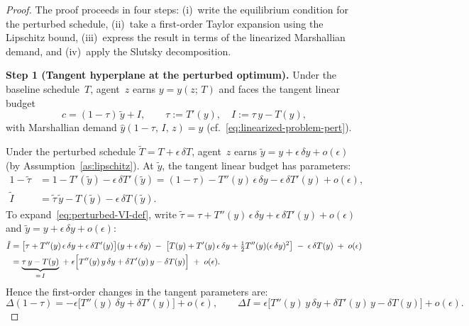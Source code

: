 \documentclass[12pt,a4paper]{article}
\theoremstyle{definition}
\theoremstyle{plain}
\theoremstyle{remark}
\begin{document}
\begin{proof}
The proof proceeds in four steps: (i)~write the equilibrium condition for the perturbed schedule, (ii)~take a first-order Taylor expansion using the Lipschitz bound, (iii)~express the result in terms of the linearized Marshallian demand, and (iv)~apply the Slutsky decomposition.

\medskip
\noindent\textbf{Step 1 (Tangent hyperplane at the perturbed optimum).}
Under the baseline schedule~$T$, agent~$z$ earns $y = y(z;\,T)$ and faces the tangent linear budget
\[
  c = (1-\tau)\,\tilde y + I,
  \qquad
  \tau := T'(y),
  \quad
  I := \tau\,y - T(y),
\]
with Marshallian demand $\hat y(1-\tau,\,I,\,z) = y$ (cf.\ \eqref{eq:linearized-problem-pert}).

Under the perturbed schedule $\tilde T = T + \epsilon\,\delta T$, agent~$z$ earns $\tilde y = y + \epsilon\,\delta y + o(\epsilon)$ (by Assumption~\ref{as:lipschitz}).  At $\tilde y$, the tangent linear budget has parameters:
\begin{align}
  1 - \tilde\tau
  &= 1 - T'(\tilde y) - \epsilon\,\delta T'(\tilde y)
  = (1-\tau) - T''(y)\,\epsilon\,\delta y - \epsilon\,\delta T'(y) + o(\epsilon),
  \label{eq:perturbed-ntr}\\[4pt]
  \tilde I
  &= \tilde\tau\,\tilde y - T(\tilde y) - \epsilon\,\delta T(\tilde y).
  \label{eq:perturbed-VI-def}
\end{align}
To expand~\eqref{eq:perturbed-VI-def}, write $\tilde\tau = \tau + T''(y)\,\epsilon\,\delta y + \epsilon\,\delta T'(y) + o(\epsilon)$ and $\tilde y = y + \epsilon\,\delta y + o(\epsilon)$:
\begin{align}
  \tilde I
  &= \bigl[\tau + T''(y)\,\epsilon\,\delta y + \epsilon\,\delta T'(y)\bigr](y + \epsilon\,\delta y)
     \;-\;
     \bigl[T(y) + T'(y)\,\epsilon\,\delta y + \tfrac{1}{2}T''(y)(\epsilon\,\delta y)^2\bigr]
     \;-\; \epsilon\,\delta T(y)
     \;+\; o(\epsilon) \notag\\
  &= \underbrace{\tau\,y - T(y)}_{=\,I}
     \;+\; \epsilon\Bigl[T''(y)\,y\,\delta y + \delta T'(y)\,y - \delta T(y)\Bigr]
     \;+\; o(\epsilon).
  \label{eq:perturbed-VI}
\end{align}
Hence the first-order changes in the tangent parameters are:
\begin{equation}
\label{eq:tangent-changes}
  \Delta(1-\tau) = -\epsilon\bigl[T''(y)\,\delta y + \delta T'(y)\bigr] + o(\epsilon),
  \qquad
  \Delta I = \epsilon\bigl[T''(y)\,y\,\delta y + \delta T'(y)\,y - \delta T(y)\bigr] + o(\epsilon).
\end{equation}


\end{proof}
\end{document}
